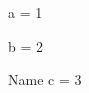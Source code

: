 \documentclass{article}
\begin{document}
\begin{titled}[Given]
a = 1
\end{titled}
\begin{titled}
b = 2
\end{titled}
\begin{named}{Name}
c = 3
\end{named}
\end{document}
